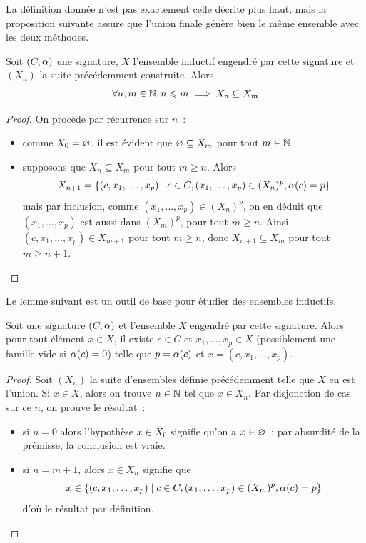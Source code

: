 La définition donnée n'est pas exactement celle décrite plus haut, mais la
proposition suivante assure que l'union finale génère bien le même ensemble
avec les deux méthodes.

\begin{proposition}
  Soit $(C,\alpha)$ une signature, $X$ l'ensemble inductif engendré par cette
  signature et $(X_n)$ la suite précédemment construite. Alors
  \[\forall n,m \in \mathbb N, n \leqslant m \implies X_n \subseteq X_m\]
\end{proposition}

\begin{proof}
  On procède par récurrence sur $n$~:
  \begin{itemize}
  \item comme $X_0 = \varnothing$, il est évident que
    $\varnothing \subseteq X_m$ pour tout $m \in\mathbb N$.
  \item supposons que $X_n \subseteq X_m$ pour tout $m \geq n$. Alors
    \[X_{n+1} = \left\{ (c,x_1,\ldots,x_p) \;\middle\vert\; c\in C, (x_1,\ldots,x_p)\in(X_n)^p,
    \alpha(c) = p \right\}\]
    mais par inclusion, comme $(x_1,\ldots,x_p)\in (X_n)^p$, on en déduit que
    $(x_1,\ldots,x_p)$ est aussi dans $(X_m)^p$, pour tout $m \geq n$. Ainsi
    $(c,x_1,\ldots,x_p) \in X_{m+1}$ pour tout $m \geq n$, donc
    $X_{n+1}\subseteq X_m$ pour tout $m \geq n+1$.\qedhere
  \end{itemize}
\end{proof}

\noindent
Le lemme suivant est un outil de base pour étudier des ensembles inductifs.

\begin{lemma}\label{lem.lecture_unique}
  Soit une signature $(C,\alpha)$ et l'ensemble $X$ engendré par cette
  signature. Alors pour tout élément $x \in X$, il existe $c\in C$ et
  $x_1,\ldots,x_p \in X$ (possiblement une famille vide si $\alpha(c) = 0$)
  telle que $p = \alpha(c)$ et $x = (c,x_1,\ldots,x_p)$.
\end{lemma}

\begin{proof}
  Soit $(X_n)$ la suite d'ensembles définie précédemment telle que $X$ en est
  l'union. Si $x\in X$, alors on trouve $n \in \mathbb N$ tel que $x\in X_n$.
  Par disjonction de cas sur ce $n$, on prouve le résultat~:
  \begin{itemize}
  \item si $n = 0$ alors l'hypothèse $x \in X_0$ signifie qu'on a
    $x\in \varnothing$~: par absurdité de la prémisse, la conclusion est vraie.
  \item si $n = m+1$, alors $x\in X_n$ signifie que
    \[x \in \left\{ (c,x_1,\ldots,x_p) \;\middle\vert\; c\in C, (x_1,\ldots,x_p)\in(X_m)^p,
    \alpha(c) = p \right\}\]
    d'où le résultat par définition.\qedhere
  \end{itemize}
\end{proof}

